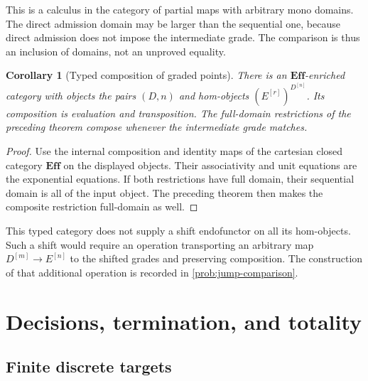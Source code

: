 \documentclass[11pt,a4paper]{article}
\numberwithin{equation}{section}
\newtheorem{corollary}[corollary]{Corollary}
\theoremstyle{definition}
\theoremstyle{remark}
\theoremstyle{plain}
\newcommand{\E}{\mathbf{Eff}}
\begin{document}
This is a calculus in the category of partial maps with arbitrary mono
domains. The direct admission domain may be larger than the sequential
one, because direct admission does not impose the intermediate grade.
The comparison is thus an inclusion of domains, not an unproved equality.

\begin{corollary}[Typed composition of graded points]
\label{cor:typed-composition}
There is an $\E$-enriched category with objects the pairs $(D,n)$ and
hom-objects $(E^{[r]})^{D^{[n]}}$. Its composition is evaluation and
transposition. The full-domain restrictions of the preceding theorem
compose whenever the intermediate grade matches.
\end{corollary}
\begin{proof}
Use the internal composition and identity maps of the cartesian closed
category $\E$ on the displayed objects. Their associativity and unit
equations are the exponential equations. If both restrictions have full
domain, their sequential domain is all of the input object. The preceding
theorem then makes the composite restriction full-domain as well.
\end{proof}

This typed category does not supply a shift endofunctor on all its
hom-objects. Such a shift would require an operation transporting an
arbitrary map $D^{[m]}\to E^{[n]}$ to the shifted grades and preserving
composition. The construction of that additional operation is recorded
in \cref{prob:jump-comparison}.

\section{Decisions, termination, and totality}
\label{sec:examples}

\subsection{Finite discrete targets}
\end{document}
